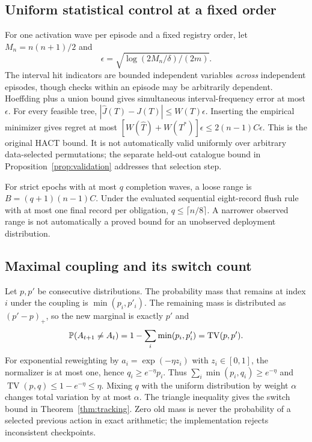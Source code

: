 \subsection{Uniform statistical control at a fixed order}
For one activation wave per episode and a fixed registry order, let $M_n=n(n+1)/2$ and
\[
 \epsilon=\sqrt{\log(2M_n/\delta)/(2m)}.
\]
The interval hit indicators are bounded independent variables \emph{across} independent episodes, though checks within an episode may be arbitrarily dependent. Hoeffding plus a union bound gives simultaneous interval-frequency error at most $\epsilon$. For every feasible tree, $|\widehat J(T)-J(T)|\le W(T)\epsilon$. Inserting the empirical minimizer gives regret at most $[W(\widehat T)+W(T^*)]\epsilon\le2(n-1)C\epsilon$. This is the original HACT bound. It is not automatically valid uniformly over arbitrary data-selected permutations; the separate held-out catalogue bound in Proposition~\ref{prop:validation} addresses that selection step.

For strict epochs with at most $q$ completion waves, a loose range is $B=(q+1)(n-1)C$. Under the evaluated sequential eight-record flush rule with at most one final record per obligation, $q\le\lceil n/8\rceil$. A narrower observed range is not automatically a proved bound for an unobserved deployment distribution.

\subsection{Maximal coupling and its switch count}
Let $p,p'$ be consecutive distributions. The probability mass that remains at index $i$ under the coupling is $\min(p_i,p'_i)$. The remaining mass is distributed as $(p'-p)_+$, so the new marginal is exactly $p'$ and
\[
 \mathbb P(A_{t+1}\ne A_t)=1-\sum_i\min(p_i,p'_i)=\operatorname{TV}(p,p').
\]
For exponential reweighting by $a_i=\exp(-\eta z_i)$ with $z_i\in[0,1]$, the normalizer is at most one, hence $q_i\ge e^{-\eta}p_i$. Thus $\sum_i\min(p_i,q_i)\ge e^{-\eta}$ and $\operatorname{TV}(p,q)\le1-e^{-\eta}\le\eta$. Mixing $q$ with the uniform distribution by weight $\alpha$ changes total variation by at most $\alpha$. The triangle inequality gives the switch bound in Theorem~\ref{thm:tracking}. Zero old mass is never the probability of a selected previous action in exact arithmetic; the implementation rejects inconsistent checkpoints.

